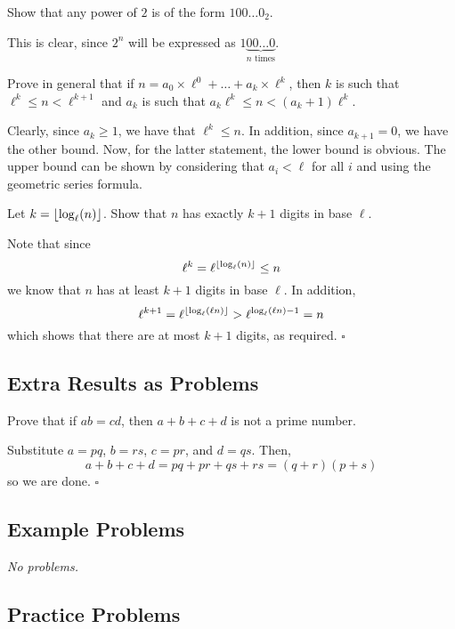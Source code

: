 \documentclass{article}
\begin{document}
\begin{problem}[1.9.2]{}
Show that any power of $2$ is of the form $100\dots0_2$.
\end{problem}
This is clear, since $2^n$ will be expressed as $1\underbrace{00\dots0}_{n\text{ times}}$.

\begin{problem}[1.9.3]{}
Prove in general that if $n = a_0 \times \ell^0 + \dots + a_k \times \ell^k$, then $k$ is such that $\ell^k \le n < \ell^{k+1}$ and $a_k$ is such that $a_k\ell^k \le n < (a_k + 1)\ell^k$.
\end{problem}
Clearly, since $a_k \ge 1$, we have that $\ell^k \le n$. In addition, since $a_{k+1} = 0$, we have the other bound. Now, for the latter statement, the lower bound is obvious. The upper bound can be shown by considering that $a_i < \ell$ for all $i$ and using the geometric series formula.

\begin{problem}[1.9.4]{}
Let $k = \left\lfloor \log_\ell(n) \right\rfloor$. Show that $n$ has exactly $k+1$ digits in base $\ell$.
\end{problem}
Note that since \[\ell^k = \ell^{\left\lfloor \log_\ell(n) \right\rfloor} \le n\] we know that $n$ has at least $k+1$ digits in base $\ell$. In addition, \[\ell^{k+1} = \ell^{\left\lfloor \log_\ell(\ell n) \right\rfloor} > \ell^{\log_\ell(\ell n)-1} = n\] which shows that there are at most $k+1$ digits, as required. $\square$

\subsection{Extra Results as Problems}

\begin{problem}[1.10.1]{}
Prove that if $ab = cd$, then $a + b + c + d$ is not a prime number.
\end{problem}
Substitute $a = pq$, $b = rs$, $c = pr$, and $d = qs$. Then, \[a+b+c+d = pq+pr+qs+rs = (q+r)(p+s)\] so we are done. $\square$

\subsection{Example Problems}

\emph{No problems.}

\subsection{Practice Problems}
\end{document}
